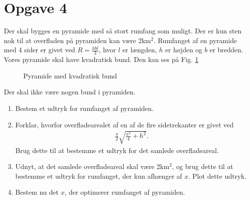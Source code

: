 \section*{Opgave 4}
Der skal bygges en pyramide med så stort rumfang som muligt. Der er kun sten nok til at overfladen på pyramiden kan være 2km$^2$. Rumfanget af en pyramide med 4 sider er givet ved $R = \frac{hbl}{3}$, hvor $l$ er længden, $h$ er højden og $b$ er bredden. Vores pyramide skal have kvadratisk bund. Den kan ses på Fig. \ref{fig:pyramide}
\begin{figure}[H]
\centering
{}
\caption{Pyramide med kvadratisk bund}
\label{fig:pyramide}
\end{figure}
Der skal ikke være nogen bund i pyramiden. 
\begin{enumerate}[label=\roman*)]
\item Bestem et udtryk for rumfanget af pyramiden. 
\item Forklar, hvorfor overfladearealet af en af de fire sidetrekanter er givet ved 
\begin{align*}
\frac{x}{2}\sqrt{\frac{x^2}{4}+h^2}.
\end{align*}
Brug dette til at bestemme et udtryk for det samlede overfladeareal. 
\item Udnyt, at det samlede overfladeareal skal være 2km$^2$, og brug dette til at bestemme et udtryk for rumfanget, der kun afhænger af $x$. Plot dette udtryk. 
\item Bestem nu det $x$, der optimerer rumfanget af pyramiden. 
\end{enumerate}

